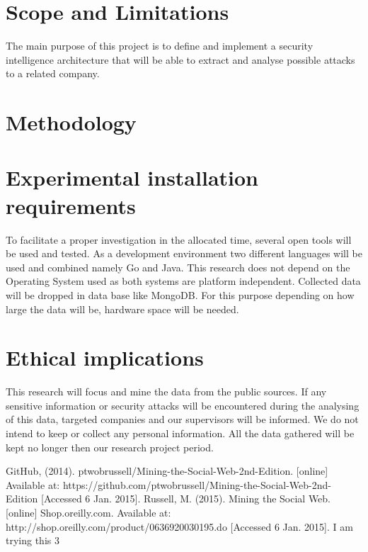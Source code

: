 \documentclass[12pt]{article}
\begin{document}
\section{Scope and Limitations}

The main purpose of this project is to define and implement a security intelligence architecture that will be able to extract and analyse possible attacks to a related company. 

 
\section{Methodology}


\section{Experimental installation requirements}

To facilitate a proper investigation in the allocated time, several open tools will be used and tested. As a development environment two different languages will be used and combined namely Go and Java. This research does not depend on the Operating System used as both systems are platform independent. Collected data will be dropped in data base like MongoDB. For this purpose depending on how large the data will be, hardware space will be needed.

\section{Ethical implications}

This research will focus and mine the data from the public sources. If any sensitive information or security attacks will be encountered during the analysing of this data, targeted companies and our supervisors will be informed. We do not intend to keep or collect any personal information. All the data gathered will be kept no longer then our research project period. 




\begin{thebibliography}{99}
  GitHub, (2014). ptwobrussell/Mining-the-Social-Web-2nd-Edition. [online] Available at: https://github.com/ptwobrussell/Mining-the-Social-Web-2nd-Edition [Accessed 6 Jan. 2015].
  Russell, M. (2015). Mining the Social Web. [online] Shop.oreilly.com. Available at: http://shop.oreilly.com/product/0636920030195.do [Accessed 6 Jan. 2015].
  I am trying this 3
\end{thebibliography}
\end{document}
